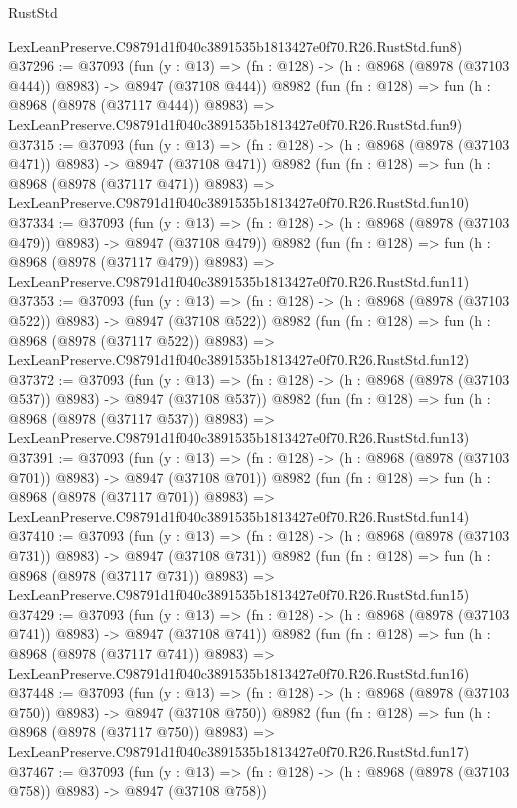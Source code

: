 \begin{lexlean}{RustStd}
\begin{coremodule}
    LexLeanPreserve.C98791d1f040c3891535b1813427e0f70.R26.RustStd.fun8)
@37296 := @37093
    (fun (y : @13) => (fn : @128) -> (h : @8968 (@8978 (@37103 @444)) @8983) -> @8947 (@37108 @444))
    @8982
    (fun (fn : @128) =>
    fun (h : @8968 (@8978 (@37117 @444)) @8983) =>
    LexLeanPreserve.C98791d1f040c3891535b1813427e0f70.R26.RustStd.fun9)
@37315 := @37093
    (fun (y : @13) => (fn : @128) -> (h : @8968 (@8978 (@37103 @471)) @8983) -> @8947 (@37108 @471))
    @8982
    (fun (fn : @128) =>
    fun (h : @8968 (@8978 (@37117 @471)) @8983) =>
    LexLeanPreserve.C98791d1f040c3891535b1813427e0f70.R26.RustStd.fun10)
@37334 := @37093
    (fun (y : @13) => (fn : @128) -> (h : @8968 (@8978 (@37103 @479)) @8983) -> @8947 (@37108 @479))
    @8982
    (fun (fn : @128) =>
    fun (h : @8968 (@8978 (@37117 @479)) @8983) =>
    LexLeanPreserve.C98791d1f040c3891535b1813427e0f70.R26.RustStd.fun11)
@37353 := @37093
    (fun (y : @13) => (fn : @128) -> (h : @8968 (@8978 (@37103 @522)) @8983) -> @8947 (@37108 @522))
    @8982
    (fun (fn : @128) =>
    fun (h : @8968 (@8978 (@37117 @522)) @8983) =>
    LexLeanPreserve.C98791d1f040c3891535b1813427e0f70.R26.RustStd.fun12)
@37372 := @37093
    (fun (y : @13) => (fn : @128) -> (h : @8968 (@8978 (@37103 @537)) @8983) -> @8947 (@37108 @537))
    @8982
    (fun (fn : @128) =>
    fun (h : @8968 (@8978 (@37117 @537)) @8983) =>
    LexLeanPreserve.C98791d1f040c3891535b1813427e0f70.R26.RustStd.fun13)
@37391 := @37093
    (fun (y : @13) => (fn : @128) -> (h : @8968 (@8978 (@37103 @701)) @8983) -> @8947 (@37108 @701))
    @8982
    (fun (fn : @128) =>
    fun (h : @8968 (@8978 (@37117 @701)) @8983) =>
    LexLeanPreserve.C98791d1f040c3891535b1813427e0f70.R26.RustStd.fun14)
@37410 := @37093
    (fun (y : @13) => (fn : @128) -> (h : @8968 (@8978 (@37103 @731)) @8983) -> @8947 (@37108 @731))
    @8982
    (fun (fn : @128) =>
    fun (h : @8968 (@8978 (@37117 @731)) @8983) =>
    LexLeanPreserve.C98791d1f040c3891535b1813427e0f70.R26.RustStd.fun15)
@37429 := @37093
    (fun (y : @13) => (fn : @128) -> (h : @8968 (@8978 (@37103 @741)) @8983) -> @8947 (@37108 @741))
    @8982
    (fun (fn : @128) =>
    fun (h : @8968 (@8978 (@37117 @741)) @8983) =>
    LexLeanPreserve.C98791d1f040c3891535b1813427e0f70.R26.RustStd.fun16)
@37448 := @37093
    (fun (y : @13) => (fn : @128) -> (h : @8968 (@8978 (@37103 @750)) @8983) -> @8947 (@37108 @750))
    @8982
    (fun (fn : @128) =>
    fun (h : @8968 (@8978 (@37117 @750)) @8983) =>
    LexLeanPreserve.C98791d1f040c3891535b1813427e0f70.R26.RustStd.fun17)
@37467 := @37093
    (fun (y : @13) => (fn : @128) -> (h : @8968 (@8978 (@37103 @758)) @8983) -> @8947 (@37108 @758))

\end{coremodule}
\end{lexlean}

